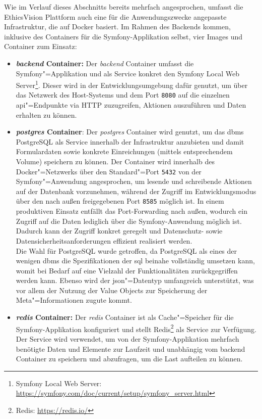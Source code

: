 \documentclass[a4paper,12pt,twoside]{scrreprt}
\begin{document}
Wie im Verlauf dieses Abschnitts bereits mehrfach angesprochen, umfasst die EthicsVision Plattform auch eine für die Anwendungszwecke angepasste Infrastruktur, die auf Docker basiert. Im Rahmen des Backends kommen, inklusive des Containers für die Symfony-Applikation selbst, vier Images und Container zum Einsatz:
\begin{itemize}
    \item \textbf{\textit{backend} Container:} Der \textit{backend} Container umfasst die Symfony"=Applikation und als Service konkret den Symfony Local Web Server\footnote{Symfony Local Web Server: \url{https://symfony.com/doc/current/setup/symfony_server.html}}. Dieser wird in der Entwicklungsumgebung dafür genutzt, um über das Netzwerk des Host-Systems und dem Port \texttt{8080} auf die einzelnen \ac{api}"=Endpunkte via HTTP zuzugreifen, Aktionen auszuführen und Daten erhalten zu können.
    \item \textbf{\textit{postgres} Container}: Der \textit{postgres} Container wird genutzt, um das \acl{dbms} PostgreSQL als Service innerhalb der Infrastruktur anzubieten und damit Formulardaten sowie konkrete Einreichungen (mittels entsprechendem Volume) speichern zu können. Der Container wird innerhalb des Docker"=Netzwerks über den Standard"=Port \texttt{5432} von der Symfony"=Anwendung angesprochen, um lesende und schreibende Aktionen auf der Datenbank vorzunehmen, während der Zugriff im Entwicklungsmodus über den nach außen freigegebenen Port \texttt{8585} möglich ist. In einem produktiven Einsatz entfällt das Port-Forwarding nach außen, wodurch ein Zugriff auf die Daten lediglich über die Symfony-Anwendung möglich ist. Dadurch kann der Zugriff konkret geregelt und Datenschutz- sowie Datensicherheitsanforderungen effizient realisiert werden.\\
    Die Wahl für PostgreSQL wurde getroffen, da PostgreSQL als eines der wenigen \ac{dbms} die Spezifikationen der \ac{sql} beinahe vollständig umsetzen kann, womit bei Bedarf auf eine Vielzahl der Funktionalitäten zurückgegriffen werden kann. Ebenso wird der \ac{json}"=Datentyp umfangreich unterstützt, was vor allem der Nutzung der Value Objects zur Speicherung der Meta"=Informationen zugute kommt. \cite{brumm_why_2019}
    \item \textbf{\textit{redis} Container:} Der \textit{redis} Container ist als Cache"=Speicher für die Symfony-Applikation konfiguriert und stellt Redis\footnote{Redis: \url{https://redis.io/}} als Service zur Verfügung. Der Service wird verwendet, um von der Symfony-Applikation mehrfach benötigte Daten und Elemente zur Laufzeit und unabhängig vom backend Container zu speichern und abzufragen, um die Last aufteilen zu können. 

\end{itemize}
\end{document}
